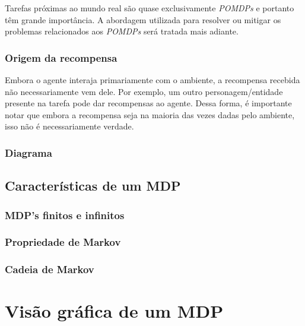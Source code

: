 \documentclass{article}
\begin{document}
                Tarefas próximas ao mundo real são quase exclusivamente \emph{POMDPs} e portanto têm grande importância. A abordagem utilizada para resolver ou mitigar os problemas relacionados aos \emph{POMDPs} será tratada mais adiante.

            \subsubsection{Origem da recompensa}
            
                Embora o agente interaja primariamente com o ambiente, a recompensa recebida não necessariamente vem dele. Por exemplo, um outro personagem/entidade presente na tarefa pode dar recompensas ao agente. Dessa forma, é importante notar que embora a recompensa seja na maioria das vezes dadas pelo ambiente, isso não é necessariamente verdade.

            \subsubsection{Diagrama}

                \begin{center}
                \rlinteractionpomdp
                \end{center}

        \subsection{Características de um MDP}
        
            \subsubsection{MDP's finitos e infinitos}
            
            \subsubsection{Propriedade de Markov}
            
            \subsubsection{Cadeia de Markov}
        
    \section{Visão gráfica de um MDP}
    
\end{document}
